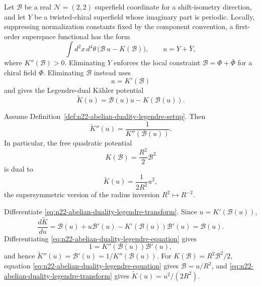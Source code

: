 \begin{definition}[Local \(\mathcal N=(2,2)\) abelian Legendre duality]
\label{def:n22-abelian-duality-legendre-setup}
Let \(\mathcal B\) be a real \(\mathcal N=(2,2)\) superfield coordinate for a
shift-isometry direction, and let \(Y\) be a twisted-chiral superfield whose
imaginary part is periodic.  Locally, suppressing normalization constants
fixed by the component convention, a first-order superspace functional has
the form
\begin{equation}
  \int d^2x\,d^4\theta\,
  \bigl(\mathcal B\,u-K(\mathcal B)\bigr),
  \qquad u=Y+\bar Y,
  \label{eq:n22-abelian-duality-first-order-kahler}
\end{equation}
where \(K''(\mathcal B)>0\).  Eliminating \(Y\) enforces the local constraint
\(\mathcal B=\Phi+\bar\Phi\) for a chiral field \(\Phi\).  Eliminating
\(\mathcal B\) instead uses
\begin{equation}
  u=K'(\mathcal B)
  \label{eq:n22-abelian-duality-legendre-equation}
\end{equation}
and gives the Legendre-dual K\"ahler potential
\begin{equation}
  \widetilde K(u)=\mathcal B(u)u-K(\mathcal B(u)).
  \label{eq:n22-abelian-duality-legendre-transform}
\end{equation}
\end{definition}

\begin{remark}
\label{rem:n22-abelian-duality-hessian-inversion}
Assume Definition~\ref{def:n22-abelian-duality-legendre-setup}.  Then
\begin{equation}
  \widetilde K''(u)=\frac{1}{K''(\mathcal B(u))}.
  \label{eq:n22-abelian-duality-hessian-inverse}
\end{equation}
In particular, the free quadratic potential
\[
  K(\mathcal B)=\frac{R^2}{2}\mathcal B^2
\]
is dual to
\[
  \widetilde K(u)=\frac{1}{2R^2}u^2,
\]
the supersymmetric version of the radius inversion
\(R^2\mapsto R^{-2}\).

Differentiate \eqref{eq:n22-abelian-duality-legendre-transform}.  Since
\(u=K'(\mathcal B(u))\),
\[
  \frac{d\widetilde K}{du}
  =
  \mathcal B(u)+u\mathcal B'(u)
  -K'(\mathcal B(u))\mathcal B'(u)
  =
  \mathcal B(u).
\]
Differentiating \eqref{eq:n22-abelian-duality-legendre-equation} gives
\[
  1=K''(\mathcal B(u))\mathcal B'(u),
\]
and hence
\(\widetilde K''(u)=\mathcal B'(u)=1/K''(\mathcal B(u))\).  For
\(K(\mathcal B)=R^2\mathcal B^2/2\), equation
\eqref{eq:n22-abelian-duality-legendre-equation} gives
\(\mathcal B=u/R^2\), and
\eqref{eq:n22-abelian-duality-legendre-transform} gives
\(\widetilde K(u)=u^2/(2R^2)\).
\end{remark}

